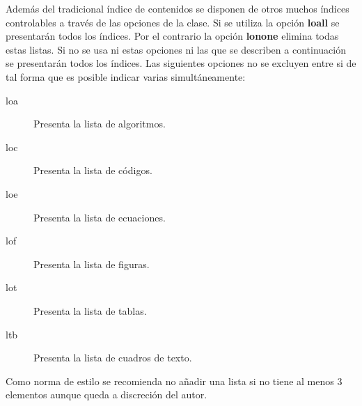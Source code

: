 Además del tradicional índice de contenidos se disponen de otros muchos índices controlables a través de las opciones de la clase. Si se utiliza la opción \textbf{loall} se presentarán todos los índices. Por el contrario la opción \textbf{lonone} elimina todas estas listas. Si no se usa ni estas opciones ni las que se describen a continuación se presentarán todos los índices. Las siguientes opciones no se excluyen entre si de tal forma que es posible indicar varias simultáneamente:

\begin{description}
  \item [loa] Presenta la lista de algoritmos.
  \item [loc] Presenta la lista de códigos.
  \item [loe] Presenta la lista de ecuaciones.
  \item [lof] Presenta la lista de figuras.
  \item [lot] Presenta la lista de tablas.
  \item [ltb] Presenta la lista de cuadros de texto.
\end{description}

Como norma de estilo se recomienda no añadir una lista si no tiene al menos 3 elementos aunque queda a discreción del autor.
